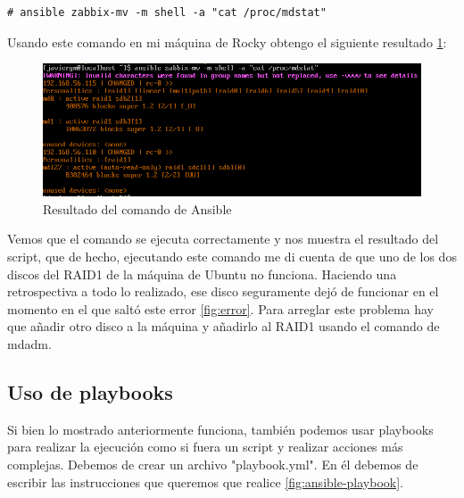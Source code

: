 \begin{lstlisting}
# ansible zabbix-mv -m shell -a "cat /proc/mdstat"
\end{lstlisting}

Usando este comando en mi máquina de Rocky obtengo el siguiente resultado \ref{fig:ansible-mdstat}:

\begin{figure}[H]
  \centering
  \includegraphics[scale=0.8]{Captura23}
  \caption{Resultado del comando de Ansible}
  \label{fig:ansible-mdstat}
\end{figure}

Vemos que el comando se ejecuta correctamente y nos muestra el resultado del script, que de hecho, ejecutando este comando me di cuenta de que uno de los dos discos del RAID1 de la máquina de Ubuntu no funciona. Haciendo una retrospectiva a todo lo realizado, ese disco seguramente dejó de funcionar en el momento en el que saltó este error \ref{fig:error}. Para arreglar este problema hay que añadir otro disco a la máquina y añadirlo al RAID1 usando el comando de mdadm.

\newpage
\subsection{Uso de playbooks}

Si bien lo mostrado anteriormente funciona, también podemos usar playbooks para realizar la ejecución como si fuera un script y realizar acciones más complejas. Debemos de crear un archivo "playbook.yml". En él debemos de escribir las instrucciones que queremos que realice \ref{fig:ansible-playbook}.

